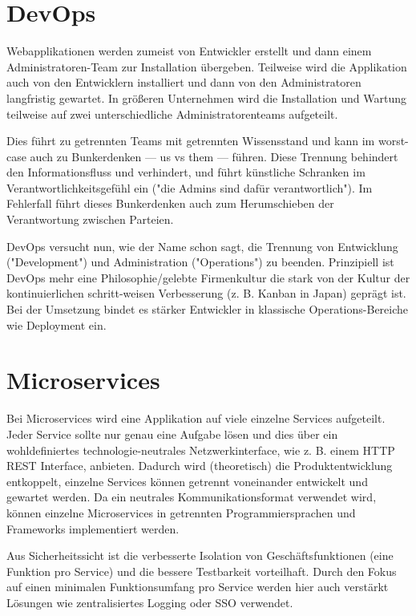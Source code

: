 \section{DevOps}

Webapplikationen werden zumeist von Entwickler erstellt und dann einem Administratoren-Team zur Installation übergeben. Teilweise wird die Applikation auch von den Entwicklern installiert und dann von den Administratoren langfristig gewartet. In größeren Unternehmen wird die Installation und Wartung teilweise auf zwei unterschiedliche Administratorenteams aufgeteilt.

Dies führt zu getrennten Teams mit getrennten Wissensstand und kann im worst-case auch zu Bunkerdenken --- us vs them --- führen. Diese Trennung behindert den Informationsfluss und verhindert, und führt künstliche Schranken im Verantwortlichkeitsgefühl ein ("die Admins sind dafür verantwortlich"). Im Fehlerfall führt dieses Bunkerdenken auch zum Herumschieben der Verantwortung zwischen Parteien.

DevOps versucht nun, wie der Name schon sagt, die Trennung von Entwicklung ("Development") und Administration ("Operations") zu beenden. Prinzipiell ist DevOps mehr eine Philosophie/gelebte Firmenkultur die stark von der Kultur der kontinuierlichen schritt-weisen Verbesserung (z. B. Kanban in Japan) geprägt ist. Bei der Umsetzung bindet es stärker Entwickler in klassische Operations-Bereiche wie Deployment ein.

\section{Microservices}

Bei Microservices wird eine Applikation auf viele einzelne Services aufgeteilt. Jeder Service sollte nur genau eine Aufgabe lösen und dies über ein wohldefiniertes technologie-neutrales Netzwerkinterface, wie z. B. einem HTTP REST Interface, anbieten. Dadurch wird (theoretisch) die Produktentwicklung entkoppelt, einzelne Services können getrennt voneinander entwickelt und gewartet werden. Da ein neutrales Kommunikationsformat verwendet wird, können einzelne Microservices in getrennten Programmiersprachen und Frameworks implementiert werden.

Aus Sicherheitssicht ist die verbesserte Isolation von Geschäftsfunktionen (eine Funktion pro Service) und die bessere Testbarkeit vorteilhaft. Durch den Fokus auf einen minimalen Funktionsumfang pro Service werden hier auch verstärkt Lösungen wie zentralisiertes Logging oder SSO verwendet.

